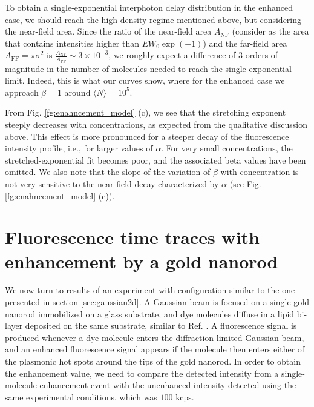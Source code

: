 To obtain a single-exponential interphoton delay distribution in the enhanced case, 
we should reach the high-density regime mentioned above, but considering the near-field area.
Since the ratio of the near-field area $A_\textrm{NF}$ (consider as the area 
that contains intensities higher than $EW_0\exp(-1)$) and the far-field area 
$A_\textrm{FF}=\pi\sigma^2$ is $\frac{A_\textrm{NF}}{A_\textrm{FF}} \sim 3\times10^{-3}$,
we roughly expect a difference of $3$ orders of magnitude in the number of molecules 
needed to reach the single-exponential limit. Indeed, this is what our
curves show, where for the enhanced case we approach $\beta=1$ around 
$\langle N \rangle=10^5$. 

From Fig. \ref{fg:enahncement_model} (c), we see that the stretching exponent steeply 
decreases with concentrations, as expected from the qualitative discussion above. 
This effect is more pronounced for a steeper decay of the fluorescence intensity 
profile, i.e., for larger values of $\alpha$. For very small concentrations, the 
stretched-exponential fit becomes poor, and the associated beta values have been 
omitted. We also note that the slope of the variation of $\beta$ with concentration 
is not very sensitive to the near-field decay characterized by $\alpha$ 
(see Fig. \ref{fg:enahncement_model} (c)). 


\section{Fluorescence time traces with enhancement by a gold nanorod \label{sec:enhancement}}

We now turn to results of an experiment with configuration similar to the one 
presented in section \ref{sec:gaussian2d}. A Gaussian beam is focused on a 
single gold nanorod immobilized on a glass substrate, and dye molecules diffuse 
in a lipid bi-layer deposited on the same substrate, similar to Ref. \cite{pradhan2016goldnanorodenhanced}. 
A fluorescence signal is produced whenever a dye molecule enters the 
diffraction-limited Gaussian beam, and an enhanced fluorescence 
signal appears if the molecule then enters either of the plasmonic hot spots 
around the tips of the gold nanorod. In order to obtain the enhancement value, 
we need to compare the detected intensity from a single-molecule enhancement event 
with the unenhanced intensity detected using the same experimental conditions, which 
was $100$ kcps\cite{pradhan2016goldnanorodenhanced}.


